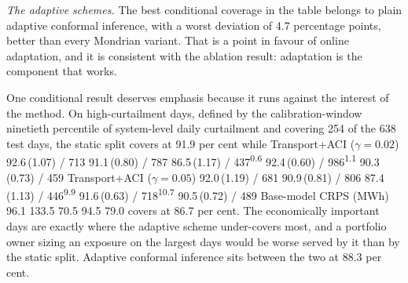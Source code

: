 \documentclass[preprint,3p,times]{elsarticle}
\providecommand{\DIFaddtex}[1]{{\protect\color{blue} \sf #1}} %
\providecommand{\DIFdeltex}[1]{{\protect\color{red} \scriptsize #1}} %
\providecommand{\DIFaddbegin}{} %
\providecommand{\DIFaddend}{} %
\providecommand{\DIFdelend}{} %
\providecommand{\DIFaddFL}[1]{\DIFadd{#1}} %
\providecommand{\DIFdelFL}[1]{\DIFdel{#1}} %
\providecommand{\DIFaddendFL}{} %
\providecommand{\DIFdelbeginFL}{} %
\providecommand{\DIFadd}[1]{\texorpdfstring{\DIFaddtex{#1}}{#1}} %
\providecommand{\DIFdel}[1]{\texorpdfstring{\DIFdeltex{#1}}{}} %
\begin{document}
\DIFaddFL{\emph{The adaptive schemes.} The best conditional coverage in the table belongs to plain adaptive conformal inference, with a worst deviation of 4.7 percentage points, better than every Mondrian variant. That is a point in favour of online adaptation, and it is consistent with the ablation result: adaptation is the component that works.
}

\DIFaddFL{One conditional result deserves emphasis because it runs against the interest of the method. On high-curtailment days, defined by the calibration-window ninetieth percentile of system-level daily curtailment and covering 254 of the 638 test days, the static split covers at 91.9 per cent while }\DIFaddendFL Transport+ACI \DIFdelbeginFL \DIFdelFL{($\gamma{=}0.02$) }%
\DIFdelFL{92.6\,(1.07) / 713 }%
\DIFdelFL{91.1\,(0.80) / 787 }%
\DIFdelFL{86.5\,(1.17) / 437\textsuperscript{0.6} }%
\DIFdelFL{92.4\,(0.60) / 986\textsuperscript{1.1} }%
\DIFdelFL{90.3\,(0.73) / 459 }%
\DIFdelFL{Transport+ACI ($\gamma{=}0.05$) }%
\DIFdelFL{92.0\,(1.19) / 681 }%
\DIFdelFL{90.9\,(0.81) / 806 }%
\DIFdelFL{87.4\,(1.13) / 446\textsuperscript{9.9} }%
\DIFdelFL{91.6\,(0.63) / 718\textsuperscript{10.7} }%
\DIFdelFL{90.5\,(0.72) / 489 }%
\DIFdelFL{Base-model CRPS (MWh)   }%
\DIFdelFL{96.1 }%
\DIFdelFL{133.5 }%
\DIFdelFL{70.5 }%
\DIFdelFL{94.5 }%
\DIFdelFL{79.0 }%
\DIFdelend \DIFaddbegin \DIFadd{covers at 86.7 per cent. The economically important days are exactly where the adaptive scheme under-covers most, and a portfolio owner sizing an exposure on the largest days would be worse served by it than by the static split. Adaptive conformal inference sits between the two at 88.3 per cent.
}\DIFaddend 
\end{document}

